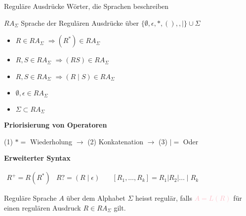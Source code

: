 \begin{definition}{Reguläre Ausdrücke}
    Wörter, die Sprachen beschreiben
\end{definition}

\begin{concept}{$R A_{\Sigma}$}
    Sprache der Regulären Ausdrücke über $\{\emptyset, \epsilon, *,(),, \mid\} \cup \Sigma$ 
    
    \begin{minipage}{0.5\linewidth}
    \begin{itemize}
        \item $R \in R A_{\Sigma}$  $\Rightarrow\left(R^{*}\right) \in R A_{\Sigma}$
        \item $R, S \in R A_{\Sigma}$ $\Rightarrow(R S) \in R A_{\Sigma}$
        \item $R, S \in R A_{\Sigma}$ $\Rightarrow(R \mid S) \in R A_{\Sigma}$   
    \end{itemize}
    \end{minipage}
    \begin{minipage}{0.3\linewidth}
        \begin{itemize}
            \item $\emptyset, \epsilon \in R A_{\Sigma}$
            \item $\Sigma \subset R A_{\Sigma}$
        \end{itemize}
    \end{minipage}

    \vspace*{1mm}

    \textbf{Priorisierung von Operatoren}
    
    (1) $*=$ Wiederholung $\rightarrow$ (2) Konkatenation $\rightarrow$ (3) $\mid=$ Oder
    
    \textbf{Erweiterter Syntax}

        $
        \begin{array}{lcr}
            R^{+} = R (R^{*}) & R ?=(R \mid \epsilon) & \quad \left[R_{1}, \ldots, R_{k}\right]=R_{1}\left|R_{2}\right| \ldots \mid R_{k} 
        \end{array}
        $
\end{concept}



\begin{definition}{Reguläre Sprache}
    $A$ über dem Alphabet $\Sigma$ heisst regulär, falls \textcolor{pink}{$A=L(R)$} für einen regulären Ausdruck $R \in R A_{\Sigma}$ gilt.
\end{definition} 

